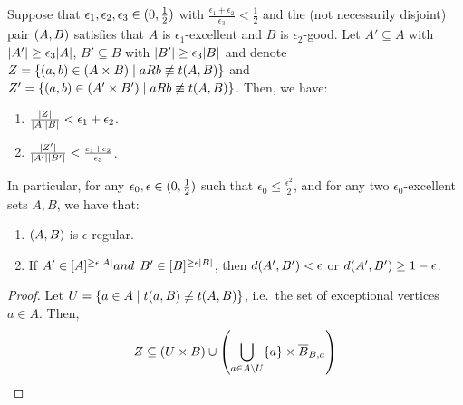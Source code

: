         \begin{lemma} \label{lem:excellence_implies_regularity}
            Suppose that $\epsilon_1, \epsilon_2, \epsilon_3 \in ( 0, \frac{1}{2} )$ with
            $\frac{\epsilon_1 + \epsilon_2}{\epsilon_3} < \frac{1}{2}$ and the (not necessarily disjoint) pair $( A,B )$ satisfies that
            $A$ is $\epsilon_1$-excellent and $B$ is $\epsilon_2$-good.
            Let $A' \subseteq A$ with $| A' | \geq \epsilon_3 | A |$,
            $B' \subseteq B$ with $| B' | \geq \epsilon_3 | B |$ and
            denote $Z = \{ ( a,b ) \in ( A \times B ) \mid a R b \not\equiv t( A,B ) \}$ and
            $Z' = \{ ( a,b ) \in ( A' \times B' ) \mid a R b \not\equiv t( A,B ) \}$.
            Then, we have:
            \begin{enumerate}
                \item \label{itm:excellence_implies_regularity.1} $\frac{| Z |}{{| A | | B |}} < \epsilon_1 + \epsilon_2$.
                \item \label{itm:excellence_implies_regularity.2} $\frac{| Z' |}{| A' | | B' |} <
                    \frac{\epsilon_1 + \epsilon_2}{\epsilon_3}$.
            \end{enumerate}
            In particular, for any $\epsilon_0, \epsilon \in ( 0, \frac{1}{2} )$ such that $\epsilon_0 \leq \frac{\epsilon^2}{2}$,
            and for any two $\epsilon_0$-excellent sets $A, B$, we have that:
            \begin{enumerate}[label=\alph*., ref=\alph*]
                \item \label{itm:excellence_implies_regularity.a} $( A,B )$ is $\epsilon$-regular.
                \item \label{itm:excellence_implies_regularity.b} If $A' \in [ A ]^{\geq \epsilon | A |} and $
                    $B' \in [ B ]^{\geq \epsilon | B |}$, then $d ( A',B' ) < \epsilon$ or
                    $d ( A',B' ) \geq 1 - \epsilon$.
            \end{enumerate}
            \begin{proof}
                Let $U = \{ a \in A \mid t(a,B) \not\equiv t(A,B) \}$, i.e.~the set
                of exceptional vertices $a \in A$.
                Then,
                \[
                    Z \subseteq (U \times B) \cup \left( \bigcup_{a \in A \setminus U} \{ a \} \times \overline{B}_{B,a} \right)
\]
\end{proof}
\end{lemma}

